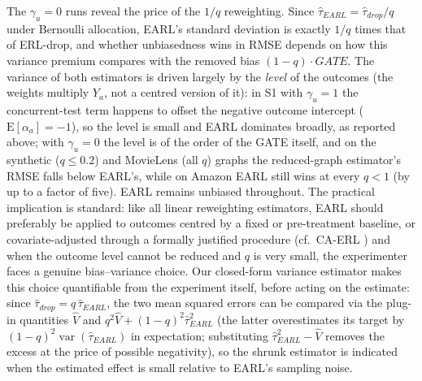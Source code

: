 \documentclass[sigconf,nonacm]{acmart}
\newcommand{\E}{\mathrm E}
\DeclareMathOperator{\var}{var}
\begin{document}
The $\gamma_u=0$ runs reveal the price of the $1/q$ reweighting. Since $\hat\tau_{EARL} = \hat\tau_{drop}/q$ under Bernoulli allocation, EARL's standard deviation is exactly $1/q$ times that of ERL-drop, and whether unbiasedness wins in RMSE depends on how this variance premium compares with the removed bias $(1-q)\cdot GATE$. The variance of both estimators is driven largely by the \emph{level} of the outcomes (the weights multiply $Y_a$, not a centred version of it): in S1 with $\gamma_u=1$ the concurrent-test term happens to offset the negative outcome intercept ($\E[\alpha_a]=-1$), so the level is small and EARL dominates broadly, as reported above; with $\gamma_u=0$ the level is of the order of the GATE itself, and on the synthetic ($q\le 0.2$) and MovieLens (all $q$) graphs the reduced-graph estimator's RMSE falls below EARL's, while on Amazon EARL still wins at every $q<1$ (by up to a factor of five). EARL remains unbiased throughout. The practical implication is standard: like all linear reweighting estimators, EARL should preferably be applied to outcomes centred by a fixed or pre-treatment baseline, or covariate-adjusted through a formally justified procedure (cf.\ CA-ERL \cite{shi2025scalableanalysisbipartiteexperiments}) and when the outcome level cannot be reduced and $q$ is very small, the experimenter faces a genuine bias--variance choice. Our closed-form variance estimator makes this choice quantifiable from the experiment itself, before acting on the estimate: since $\hat\tau_{drop}=q\,\hat\tau_{EARL}$, the two mean squared errors can be compared via the plug-in quantities $\hat V$ and $q^2\hat V + (1-q)^2\hat\tau^2_{EARL}$ (the latter overestimates its target by $(1-q)^2\var(\hat\tau_{EARL})$ in expectation; substituting $\hat\tau^2_{EARL}-\hat V$ removes the excess at the price of possible negativity), so the shrunk estimator is indicated when the estimated effect is small relative to EARL's sampling noise.
\end{document}
